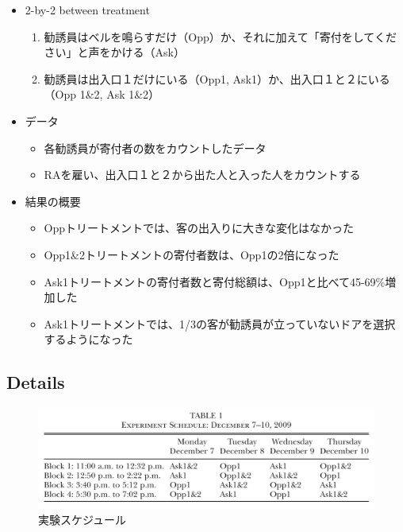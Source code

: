 \documentclass[../root]{subfiles}
\begin{document}
    \begin{itemize}
        \item 2-by-2 between treatment
        \begin{enumerate}
            \item 勧誘員はベルを鳴らすだけ（Opp）か、それに加えて「寄付をしてください」と声をかける（Ask）
            \item 勧誘員は出入口１だけにいる（Opp1, Ask1）か、出入口１と２にいる（Opp 1\&2, Ask 1\&2）
        \end{enumerate}
        \item データ
        \begin{itemize}
            \item 各勧誘員が寄付者の数をカウントしたデータ
            \item RAを雇い、出入口１と２から出た人と入った人をカウントする
        \end{itemize}
        \item 結果の概要
        \begin{itemize}
            \item Oppトリートメントでは、客の出入りに大きな変化はなかった
            \item Opp1\&2トリートメントの寄付者数は、Opp1の2倍になった
            \item Ask1トリートメントの寄付者数と寄付総額は、Opp1と比べて45-69\%増加した
            \item Ask1トリートメントでは、1/3の客が勧誘員が立っていないドアを選択するようになった
        \end{itemize}
    \end{itemize}


    \subsection{Details}

    \begin{figure}[h]
        \centering
        \includegraphics[width = 0.8\linewidth]{0821kato/fig2_1.png}
        \caption{実験スケジュール}
        \label{}
    \end{figure}
\end{document}
